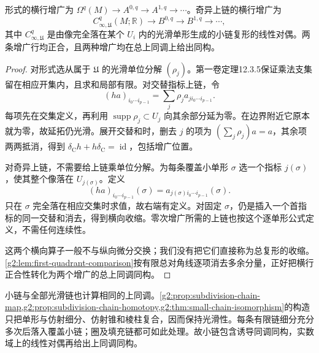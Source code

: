 \begin{lemma}\label{g2:lem:de-rham-augmented-rows}
	形式的横行增广为 \(\Omega^q(M)\to A^{0,q}\to A^{1,q}\to\cdots\)。奇异上链的横行增广为
	\[
		C_{\infty,\mathfrak U}^q(M;\mathbb R)\longrightarrow B^{0,q}\longrightarrow B^{1,q}\longrightarrow\cdots,
	\]
	其中 \(C_{\infty,\mathfrak U}^q\) 是由像完全落在某个 \(U_i\) 内的光滑单形生成的小链复形的线性对偶。两条增广行均正合，且两种增广均在总上同调上给出同构。
\end{lemma}
\begin{proof}
	对形式选从属于 \(\mathfrak U\) 的光滑单位分解 \((\rho_j)\)。第一卷定理12.3.5保证乘法支集留在相应开集内，且求和局部有限。对交替指标上链，令
	\[
		(ha)_{i_0\cdots i_{p-1}}=\sum_j\rho_j a_{j i_0\cdots i_{p-1}}.
	\]
	每项先在交集定义，再利用 \(\operatorname{supp}\rho_j\subset U_j\) 向其余部分延为零。在边界附近它原本就为零，故延拓仍光滑。展开交替和时，删去 \(j\) 的项为 \((\sum_j\rho_j)a=a\)，其余项两两抵消，得到 \(\delta_{\mathrm C}h+h\delta_{\mathrm C}=\operatorname{id}\)，包括增广位置。

	对奇异上链，不需要给上链乘单位分解。为每条覆盖小单形 \(\sigma\) 选一个指标 \(j(\sigma)\)，使其整个像落在 \(U_{j(\sigma)}\)。定义
	\[
		(ha)_{i_0\cdots i_{p-1}}(\sigma)
		=a_{j(\sigma)i_0\cdots i_{p-1}}(\sigma).
	\]
	只在 \(\sigma\) 完全落在相应交集时求值，故右端有定义。对固定 \(\sigma\)，仍是插入一个首指标的同一交替和消去，得到横向收缩。零次增广所需的上链也按这个逐单形公式定义，不需任何连续性。

	这两个横向算子一般不与纵向微分交换；我们没有把它们直接称为总复形的收缩。\cref{g2:lem:first-quadrant-comparison}按有限总对角线逐项消去多余分量，正好把横行正合性转化为两个增广的总上同调同构。
\end{proof}

小链与全部光滑链也计算相同的上同调。\cref{g2:prop:subdivision-chain-map,g2:prop:subdivision-chain-homotopy,g2:thm:small-chain-isomorphism}的构造只把单形与仿射细分、仿射锥和棱柱复合，因而保持光滑性。每条有限链细分充分多次后落入覆盖小链；圈及填充链都可如此处理。故小链包含诱导同调同构，实数域上的线性对偶再给出上同调同构。


